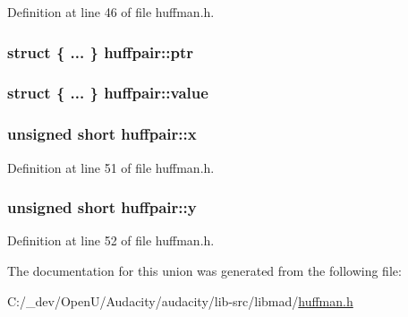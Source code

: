 Definition at line 46 of file huffman.\+h.

\subsubsection[{\texorpdfstring{ptr}{ptr}}]{\setlength{\rightskip}{0pt plus 5cm}struct \{ ... \}   huffpair\+::ptr}\hypertarget{unionhuffpair_ad79592953452a9c8ae877dd743ead8ae}{}\label{unionhuffpair_ad79592953452a9c8ae877dd743ead8ae}
\subsubsection[{\texorpdfstring{value}{value}}]{\setlength{\rightskip}{0pt plus 5cm}struct \{ ... \}   huffpair\+::value}\hypertarget{unionhuffpair_a854c78a83d5ca88dfab1cf269f225697}{}\label{unionhuffpair_a854c78a83d5ca88dfab1cf269f225697}
\subsubsection[{\texorpdfstring{x}{x}}]{\setlength{\rightskip}{0pt plus 5cm}unsigned short huffpair\+::x}\hypertarget{unionhuffpair_a5f710f0abf05d44c1b44604b6866ff22}{}\label{unionhuffpair_a5f710f0abf05d44c1b44604b6866ff22}


Definition at line 51 of file huffman.\+h.

\subsubsection[{\texorpdfstring{y}{y}}]{\setlength{\rightskip}{0pt plus 5cm}unsigned short huffpair\+::y}\hypertarget{unionhuffpair_ab106e3a601747fd19dc6e161cd87d666}{}\label{unionhuffpair_ab106e3a601747fd19dc6e161cd87d666}


Definition at line 52 of file huffman.\+h.



The documentation for this union was generated from the following file\+:\begin{DoxyCompactItemize}
\item 
C\+:/\+\_\+dev/\+Open\+U/\+Audacity/audacity/lib-\/src/libmad/\hyperlink{huffman_8h}{huffman.\+h}\end{DoxyCompactItemize}
